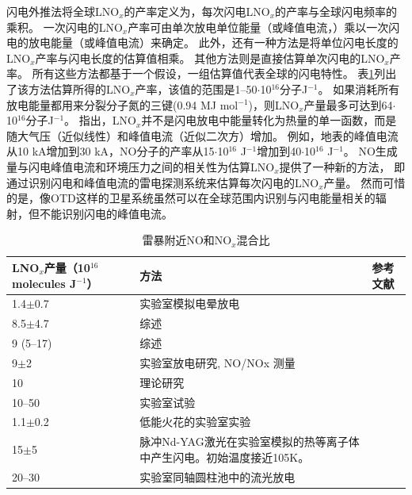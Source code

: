 闪电外推法将全球LNO$_x$的产率定义为，每次闪电LNO$_x$的产率与全球闪电频率的乘积\citep{Lawrence.1995}。
一次闪电的LNO$_x$产率可由单次放电单位能量（或峰值电流，\citet{Wang.1998}）乘以一次闪电的放电能量（或峰值电流）来确定。
此外，还有一种方法是将单位闪电长度的LNO$_x$产率与闪电长度的估算值相乘。
其他方法则是直接估算单次闪电的LNO$_x$产率。
所有这些方法都基于一个假设，一组估算值代表全球的闪电特性。
表\ref{table:LNOx/J}列出了该方法估算所得的LNO$_x$产率，该值的范围是1--50$\cdot$10$^{16}$分子J$^{-1}$。
如果消耗所有放电能量都用来分裂分子氮的三键(0.94 MJ mol$^{-1}$)，则LNO$_x$产量最多可达到64$\cdot$10$^{16}$分子J$^{-1}$。
\citet{Wang.1998}指出，LNO$_x$并不是闪电放电中能量转化为热量的单一函数，而是随大气压（近似线性）和峰值电流（近似二次方）增加。
例如，地表的峰值电流从10 kA增加到30 kA，NO分子的产率从15$\cdot$10$^{16}$ J$^{-1}$增加到40$\cdot$10$^{16}$ J$^{-1}$。
NO生成量与闪电峰值电流和环境压力之间的相关性为估算LNO$_x$提供了一种新的方法，
即通过识别闪电和峰值电流的雷电探测系统来估算每次闪电的LNO$_x$产量。
然而可惜的是，像OTD这样的卫星系统虽然可以在全球范围内识别与闪电能量相关的辐射\citep{Baker.1999}，但不能识别闪电的峰值电流。

{
\centering
\footnotesize
\begin{longtable}
{|p{15em}|p{13em}|p{10em}|}
\caption{雷暴附近NO和NO$_x$混合比}
\label{table:LNOx/J} \\
\hline
LNO$_x$产量（10$^{16}$ molecules J$^{-1}$）   & 方法                          & 参考文献 \\ \hline
1.4$\pm$0.7                                  & 实验室模拟电晕放电              & \citet{Hill.1988} \\ \hline
8.5$\pm$4.7                                  & 综述                          & \citet{Lawrence.1995} \\ \hline
9 (5--17)                                    & 综述                          & \citet{Biazar.1995} \\ \hline
9$\pm$2                                      & 实验室放电研究, NO/NOx 测量     & \citet{Stark.1996} \\ \hline
10                                           & 理论研究                      & \citet{Price.1997a,Price.1997b} \\ \hline
10--50                                       & 实验室试验                    & \citet{Wang.1998} \\ \hline
1.1$\pm$0.2                                  & 低能火花的实验室实验            & \citet{Cook.2000} \\ \hline
15$\pm$5    & 脉冲Nd-YAG激光在实验室模拟的热等离子体中产生闪电。初始温度接近105K。    & \citet{Navarro-Gonzalez.2001} \\ \hline
20--30      & 实验室同轴圆柱池中的流光放电                                       & \citet{Cooray.2005} \\ \hline
\end{longtable}\par
}


